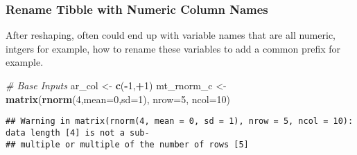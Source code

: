 \documentclass[
]{book}
\newenvironment{Shaded}{\begin{snugshade}}{\end{snugshade}}
\newcommand{\CommentTok}[1]{\textcolor[rgb]{0.56,0.35,0.01}{\textit{#1}}}
\newcommand{\DataTypeTok}[1]{\textcolor[rgb]{0.13,0.29,0.53}{#1}}
\newcommand{\DecValTok}[1]{\textcolor[rgb]{0.00,0.00,0.81}{#1}}
\newcommand{\KeywordTok}[1]{\textcolor[rgb]{0.13,0.29,0.53}{\textbf{#1}}}
\newcommand{\NormalTok}[1]{#1}
\newcommand{\OperatorTok}[1]{\textcolor[rgb]{0.81,0.36,0.00}{\textbf{#1}}}
\newcommand{\StringTok}[1]{\textcolor[rgb]{0.31,0.60,0.02}{#1}}
\begin{document}
\begin{Shaded}
\end{Shaded}

\begin{table}[!h]
\centering
{}
\end{table}

\hypertarget{rename-tibble-with-numeric-column-names}{%
\subsubsection{Rename Tibble with Numeric Column Names}\label{rename-tibble-with-numeric-column-names}}

After reshaping, often could end up with variable names that are all numeric, intgers for example, how to rename these variables to add a common prefix for example.

\begin{Shaded}
\begin{Highlighting}[]
\CommentTok{# Base Inputs}
\NormalTok{ar_col <-}\StringTok{ }\KeywordTok{c}\NormalTok{(}\OperatorTok{-}\DecValTok{1}\NormalTok{,}\OperatorTok{+}\DecValTok{1}\NormalTok{)}
\NormalTok{mt_rnorm_c <-}\StringTok{ }\KeywordTok{matrix}\NormalTok{(}\KeywordTok{rnorm}\NormalTok{(}\DecValTok{4}\NormalTok{,}\DataTypeTok{mean=}\DecValTok{0}\NormalTok{,}\DataTypeTok{sd=}\DecValTok{1}\NormalTok{), }\DataTypeTok{nrow=}\DecValTok{5}\NormalTok{, }\DataTypeTok{ncol=}\DecValTok{10}\NormalTok{)}
\end{Highlighting}
\end{Shaded}

\begin{verbatim}
## Warning in matrix(rnorm(4, mean = 0, sd = 1), nrow = 5, ncol = 10): data length [4] is not a sub-
## multiple or multiple of the number of rows [5]
\end{verbatim}
\end{document}
